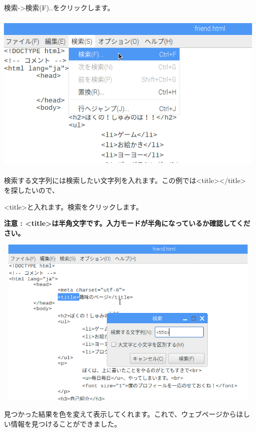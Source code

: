\documentclass[a4paper,12pt,dvipdfmx]{jarticle}
\begin{document}
検索-{\textgreater}検索(F)..をクリックします。

\begin{center}
\includegraphics[width=16.533cm,height=7.918cm]{textbook-img010.png}

\end{center}
\clearpage
検索する文字列には検索したい文字列を入れます。この例では{\textless}title{\textgreater}{\textless}/title{\textgreater}を探したいので、

{\textless}title{\textgreater}と入れます。検索をクリックします。

{\bfseries
注意 :
{\textless}title{\textgreater}は半角文字です。入力モードが半角になっているか確認してください。}


\begin{center}
\includegraphics[width=16.625cm,height=8.371cm]{textbook-img012.png}

\end{center}
見つかった結果を色を変えて表示してくれます。これで、ウェブページからほしい情報を見つけることができました。
\end{document}
